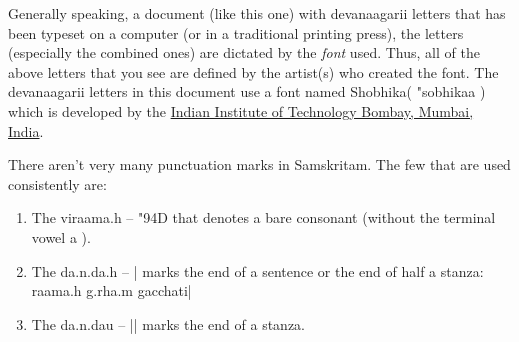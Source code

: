 \documentclass[a4paper, 12pt]{article}
\newcommand \sans[1]{
    \textsanskrit{#1}
}
\begin{document}
Generally speaking, a document (like this one) with \sans{devanaagarii} letters that has been typeset on a computer (or in a traditional printing press), the letters (especially the combined ones) are dictated by the \emph{font} used. Thus, all of the above letters that you see are defined by the artist(s) who created the font. The \sans{devanaagarii} letters in this document use a font named Shobhika(\sans{"sobhikaa}) which is developed by the \href{https://github.com/Sandhi-IITBombay/Shobhika}{Indian Institute of Technology Bombay, Mumbai, India}.

There aren't very many punctuation marks in Samskritam. The few that are used consistently are:
\begin{enumerate}
    \item The \sans{viraama.h -- \char"94D} that denotes a bare consonant (without the terminal vowel \sans{a}).
    \item The \sans{da.n.da.h -- |} marks the end of a sentence or the end of half a stanza: \sans{raama.h g.rha.m gacchati|}
    \item The \sans{da.n.dau -- ||} marks the end of a stanza.
\end{enumerate}



\newpage
\appendix
\end{document}
